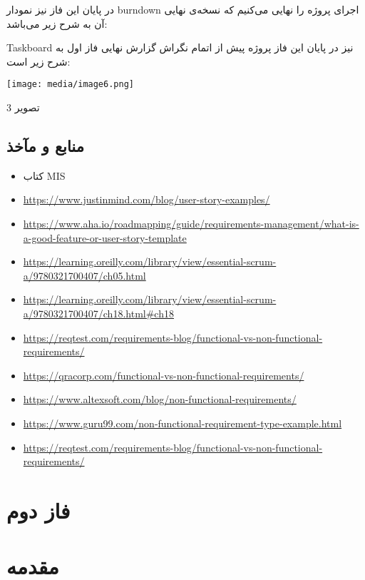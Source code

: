 \documentclass[]{article}
\begin{document}
در پایان این فاز نیز نمودار burndown اجرای پروژه را نهایی می‌کنیم که
نسخه‌ی نهایی آن به شرح زیر می‌باشد:

Taskboard نیز در پایان این فاز پروژه پیش از اتمام نگراش گزارش نهایی فاز
اول به شرح زیر است:

\texttt{[image: media/image6.png]}

تصویر 3

\subsection{منابع و
مآخذ}\label{ux645ux646ux627ux628ux639-ux648-ux645ux622ux62eux630}

\begin{itemize}
\item
  کتاب MIS
\end{itemize}

\begin{itemize}
\item
  \url{https://www.justinmind.com/blog/user-story-examples/}
\item
  \url{https://www.aha.io/roadmapping/guide/requirements-management/what-is-a-good-feature-or-user-story-template}
\item
  \url{https://learning.oreilly.com/library/view/essential-scrum-a/9780321700407/ch05.html}
\item
  \url{https://learning.oreilly.com/library/view/essential-scrum-a/9780321700407/ch18.html\#ch18}
\item
  \url{https://reqtest.com/requirements-blog/functional-vs-non-functional-requirements/}
\item
  \url{https://qracorp.com/functional-vs-non-functional-requirements/}
\item
  \url{https://www.altexsoft.com/blog/non-functional-requirements/}
\item
  \url{https://www.guru99.com/non-functional-requirement-type-example.html}
\item
  \url{https://reqtest.com/requirements-blog/functional-vs-non-functional-requirements/}
\end{itemize}

\section{فاز دوم}\label{ux641ux627ux632-ux62fux648ux645}

\section{مقدمه}\label{ux645ux642ux62fux645ux647-1}
\end{document}
